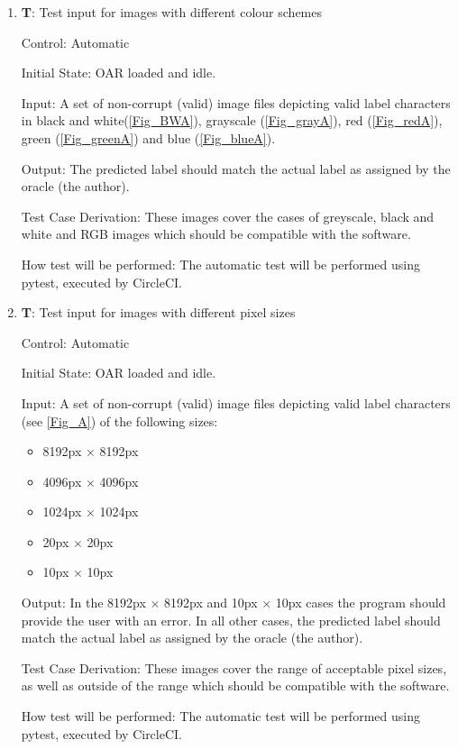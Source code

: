 \documentclass[12pt, titlepage]{article}
\newcounter{testnum} %
\begin{document}
\begin{enumerate}

  \item{\textbf{T\thetestnum \label{T_inputColour}}: Test input for images with different colour schemes\\}
            
  Control: Automatic
            
  Initial State: OAR loaded and idle.
            
  Input: A set of non-corrupt (valid) image files depicting valid label characters in black and white(\ref{Fig_BWA}), 
  grayscale (\ref{Fig_grayA}), red (\ref{Fig_redA}), green (\ref{Fig_greenA}) and blue (\ref{Fig_blueA}).
  
  Output: The predicted label should match the actual label as assigned by the oracle (the author).
            
  Test Case Derivation: These images cover the cases of greyscale, black and white and RGB images which should be compatible with the software.
            
  How test will be performed: The automatic test will be performed using pytest, executed by CircleCI.

  \item{\textbf{T\thetestnum \label{T_inputSize}}: Test input for images with different pixel sizes\\}
            
  Control: Automatic
            
  Initial State: OAR loaded and idle.
            
  Input: A set of non-corrupt (valid) image files depicting valid label characters (see \ref{Fig_A}) of the following sizes:
  \begin{itemize}
    \item{8192px $\times$ 8192px}
    \item{4096px $\times$ 4096px}
    \item{1024px $\times$ 1024px}
    \item{20px $\times$ 20px}
    \item{10px $\times$ 10px}
  \end{itemize}
            
  Output: In the 8192px $\times$ 8192px and 10px $\times$ 10px cases the program should provide the user with an error. In all other cases,
  the predicted label should match the actual label as assigned by the oracle (the author).
            
  Test Case Derivation: These images cover the range of acceptable pixel sizes, as well as outside of the range which should be compatible with the software.
            
  How test will be performed: The automatic test will be performed using pytest, executed by CircleCI.
\end{enumerate}
\end{document}
